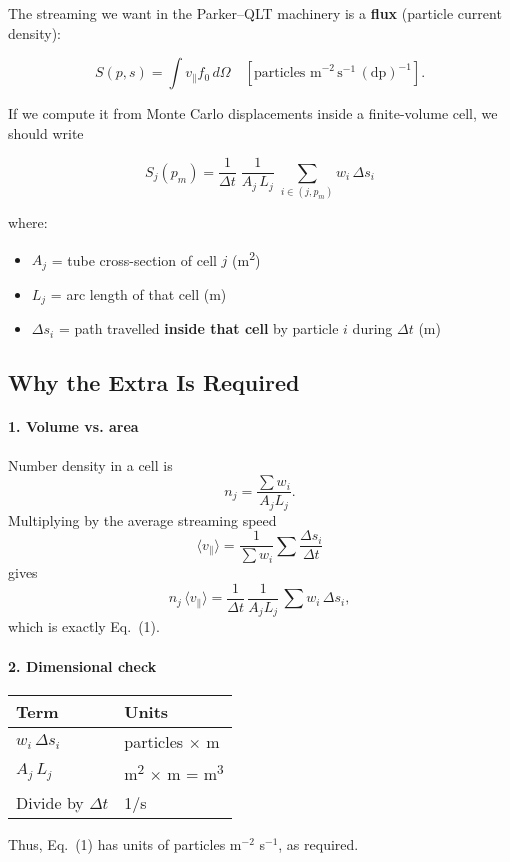 The streaming we want in the Parker–QLT machinery is a \textbf{flux} (particle current density):

\[
S(p,s) = \int v_\parallel f_0\,d\Omega
\quad\left[\text{particles m}^{-2}\,\text{s}^{-1}\,(\text{dp})^{-1}\right].
\]

If we compute it from Monte Carlo displacements inside a finite-volume cell, we should write

\[
\boxed{
S_{j}(p_m)
  =\frac{1}{\Delta t}\;
   \frac{1}{A_j\,L_j}\;
   \sum_{i\in(j,p_m)}
   w_i\,\Delta s_i
}
\tag{1}
\]

where:
\begin{itemize}
  \item $A_j$ = tube cross-section of cell $j$ (m\textsuperscript{2})
  \item $L_j$ = arc length of that cell (m)
  \item $\Delta s_i$ = path travelled \textbf{inside that cell} by particle $i$ during $\Delta t$ (m)
\end{itemize}

\subsection*{Why the Extra  Is Required}

\paragraph{1. Volume vs. area}
Number density in a cell is
\[
n_j = \frac{\sum w_i}{A_j L_j}.
\]
Multiplying by the average streaming speed
\[
\langle v_\parallel \rangle = \frac{1}{\sum w_i} \sum \frac{\Delta s_i}{\Delta t}
\]
gives
\[
n_j\,\langle v_\parallel\rangle
= \frac{1}{\Delta t}\,\frac{1}{A_j L_j}\,\sum w_i\,\Delta s_i,
\]
which is exactly Eq.~(1).

\paragraph{2. Dimensional check}
\begin{center}
\begin{tabular}{@{}ll@{}}
\toprule
Term & Units \\
\midrule
$w_i\,\Delta s_i$ & particles $\times$ m \\
$A_j\,L_j$ & m\textsuperscript{2} $\times$ m = m\textsuperscript{3} \\
Divide by $\Delta t$ & 1/s \\
\bottomrule
\end{tabular}
\end{center}
Thus, Eq.~(1) has units of particles m$^{-2}$ s$^{-1}$, as required.

